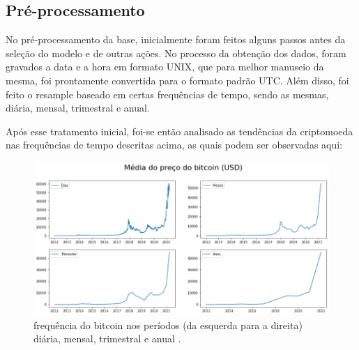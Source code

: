 \documentclass[sigplan,screen]{acmart}
\begin{document}
\subsection{Pré-processamento}
No pré-processamento da base, inicialmente foram feitos alguns passos antes da seleção do modelo e de outras ações.
No processo da obtenção dos dados, foram gravados a data e a hora em formato UNIX, que para melhor manuseio da mesma, foi prontamente convertida para o formato padrão UTC.
Além disso, foi feito o resample baseado em certas frequências de tempo, sendo as mesmas, diária, mensal, trimestral e anual.

Após esse tratamento inicial, foi-se então analisado as tendências da criptomoeda nas frequências de tempo descritas acima, as quais podem ser observadas aqui:
\begin{figure}[h]
  \centering
  \includegraphics[width=\linewidth]{ibagens/Estudante.png}
  \caption{frequência do bitcoin nos períodos (da esquerda para a direita) diária, mensal, trimestral e anual .}
\end{figure}
















\end{document}

